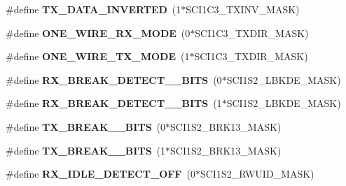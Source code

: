 \begin{DoxyCompactItemize}
\item 
\hypertarget{group__hal__hcs08_gaf02f81f6666e2f43e2dd36a778e10a5b}{\#define {\bfseries T\-X\-\_\-\-D\-A\-T\-A\-\_\-\-I\-N\-V\-E\-R\-T\-E\-D}~(1$\ast$S\-C\-I1\-C3\-\_\-\-T\-X\-I\-N\-V\-\_\-\-M\-A\-S\-K)}\label{group__hal__hcs08_gaf02f81f6666e2f43e2dd36a778e10a5b}

\item 
\hypertarget{group__hal__hcs08_ga25413b97ae398d27727d76c969feb05a}{\#define {\bfseries O\-N\-E\-\_\-\-W\-I\-R\-E\-\_\-\-R\-X\-\_\-\-M\-O\-D\-E}~(0$\ast$S\-C\-I1\-C3\-\_\-\-T\-X\-D\-I\-R\-\_\-\-M\-A\-S\-K)}\label{group__hal__hcs08_ga25413b97ae398d27727d76c969feb05a}

\item 
\hypertarget{group__hal__hcs08_gad2761bc976329eb0899a71626b8ab828}{\#define {\bfseries O\-N\-E\-\_\-\-W\-I\-R\-E\-\_\-\-T\-X\-\_\-\-M\-O\-D\-E}~(1$\ast$S\-C\-I1\-C3\-\_\-\-T\-X\-D\-I\-R\-\_\-\-M\-A\-S\-K)}\label{group__hal__hcs08_gad2761bc976329eb0899a71626b8ab828}

\item 
\hypertarget{group__hal__hcs08_ga39df5c5d34b30aaee2892d35fa035cf3}{\#define {\bfseries R\-X\-\_\-\-B\-R\-E\-A\-K\-\_\-\-D\-E\-T\-E\-C\-T\-\_\-\_\-\-B\-I\-T\-S}~(0$\ast$S\-C\-I1\-S2\-\_\-\-L\-B\-K\-D\-E\-\_\-\-M\-A\-S\-K)}\label{group__hal__hcs08_ga39df5c5d34b30aaee2892d35fa035cf3}

\item 
\hypertarget{group__hal__hcs08_gaea6a929697eb2b8b2afd702a8fba5467}{\#define {\bfseries R\-X\-\_\-\-B\-R\-E\-A\-K\-\_\-\-D\-E\-T\-E\-C\-T\-\_\-\_\-\-B\-I\-T\-S}~(1$\ast$S\-C\-I1\-S2\-\_\-\-L\-B\-K\-D\-E\-\_\-\-M\-A\-S\-K)}\label{group__hal__hcs08_gaea6a929697eb2b8b2afd702a8fba5467}

\item 
\hypertarget{group__hal__hcs08_gaca187a7c41efdd9de1e53a53342f20c8}{\#define {\bfseries T\-X\-\_\-\-B\-R\-E\-A\-K\-\_\-\_\-\-B\-I\-T\-S}~(0$\ast$S\-C\-I1\-S2\-\_\-\-B\-R\-K13\-\_\-\-M\-A\-S\-K)}\label{group__hal__hcs08_gaca187a7c41efdd9de1e53a53342f20c8}

\item 
\hypertarget{group__hal__hcs08_gaaa6fae15a2b05ec500d6fa657bcde50a}{\#define {\bfseries T\-X\-\_\-\-B\-R\-E\-A\-K\-\_\-\_\-\-B\-I\-T\-S}~(1$\ast$S\-C\-I1\-S2\-\_\-\-B\-R\-K13\-\_\-\-M\-A\-S\-K)}\label{group__hal__hcs08_gaaa6fae15a2b05ec500d6fa657bcde50a}

\item 
\hypertarget{group__hal__hcs08_gaa4a66785d136b84e2cfc141ca32c9aa2}{\#define {\bfseries R\-X\-\_\-\-I\-D\-L\-E\-\_\-\-D\-E\-T\-E\-C\-T\-\_\-\-O\-F\-F}~(0$\ast$S\-C\-I1\-S2\-\_\-\-R\-W\-U\-I\-D\-\_\-\-M\-A\-S\-K)}\label{group__hal__hcs08_gaa4a66785d136b84e2cfc141ca32c9aa2}


\end{DoxyCompactItemize}
